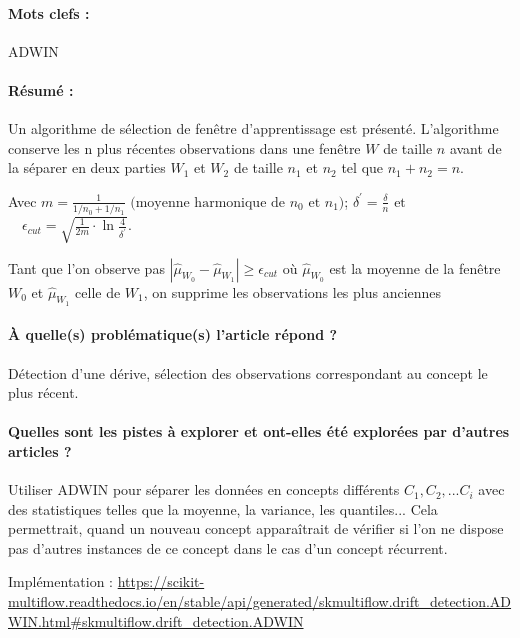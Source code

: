 \documentclass[11pt,a4paper]{report}
\begin{document}
\paragraph{Mots clefs :} ADWIN

\paragraph{Résumé :} Un algorithme de sélection de fenêtre d’apprentissage est présenté. L’algorithme conserve les n plus récentes observations dans une fenêtre $W$ de taille $n$ avant de la séparer en deux parties $W_1$ et $W_2$ de taille $n_1$ et $n_2$ tel que $n_1+n_2=n$. 

Avec $m=\frac{1}{1 / n_{0}+1 / n_{1}} \text { (moyenne harmonique de } n_{0} \text { et } n_{1} )  $; $\delta^{\prime}=\frac{\delta}{n} \text{ et } $ $ \quad \epsilon_{c u t}=\sqrt{\frac{1}{2 m} \cdot \ln \frac{4}{\delta^{\prime}}}$. 

Tant que l'on observe pas $\left|\hat{\mu}_{W_{0}}-\hat{\mu}_{W_{1}}\right| \geq \epsilon_{c u t}$ où $\hat{\mu}_{W_{0}}$ est la moyenne de la fenêtre $W_0$ et $\hat{\mu}_{W_{1}}$ celle de $W_1$, on supprime les observations les plus anciennes

\paragraph{À quelle(s) problématique(s) l'article répond ?} Détection d'une dérive, sélection des observations correspondant au concept le plus récent.

\paragraph{Quelles sont les pistes à explorer et ont-elles  été explorées par d'autres articles ?} Utiliser ADWIN pour séparer les données en concepts différents $C_1, C_2, ... C_i$ avec des statistiques telles que la moyenne, la variance, les quantiles... Cela permettrait, quand un nouveau concept apparaîtrait de vérifier si l'on ne dispose pas d'autres instances de ce concept dans le cas d'un concept récurrent.

Implémentation : \url{https://scikit-multiflow.readthedocs.io/en/stable/api/generated/skmultiflow.drift_detection.ADWIN.html#skmultiflow.drift_detection.ADWIN}
\end{document}
